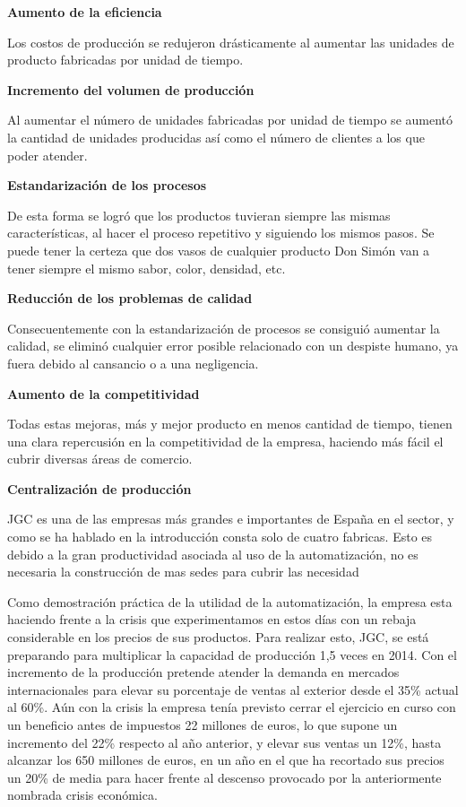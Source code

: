 \documentclass[11pt,a4paper,spanish,twoside]{report}
\begin{document}
\begin{description}
\item \textbf{Aumento de la eficiencia}

Los costos de producción se redujeron drásticamente al aumentar las
unidades de producto fabricadas por unidad de tiempo. 

\item \textbf{Incremento del volumen de producción}

Al aumentar el número de unidades fabricadas por unidad de tiempo se aumentó
la cantidad de unidades producidas así como el número de clientes a los que
poder atender.

\item \textbf{Estandarización de los procesos}

De esta forma se logró que los productos tuvieran siempre las mismas
características, al hacer el proceso repetitivo y siguiendo los mismos
pasos. Se puede tener la certeza que dos vasos de cualquier producto Don
Simón van a tener siempre el mismo sabor, color, densidad, etc.

\item \textbf{Reducción de los problemas de calidad}

Consecuentemente con la estandarización de procesos se consiguió aumentar la
calidad, se eliminó cualquier error posible relacionado con un despiste
humano, ya fuera debido al cansancio o a una negligencia. 

\item \textbf{Aumento de la competitividad}

Todas estas mejoras, más y mejor producto en menos cantidad de
tiempo, tienen una clara repercusión en la competitividad de la empresa,
haciendo más fácil el cubrir diversas áreas de comercio. 

\item \textbf{Centralización de producción}

JGC es una de las empresas más grandes e importantes de España en el sector,
y como se ha hablado en la introducción consta solo de cuatro fabricas. Esto
es debido a la gran productividad asociada al uso de la automatización, no es
necesaria la construcción de mas sedes para cubrir las necesidad

\end{description}

Como demostración práctica de la utilidad de la automatización, la empresa
esta haciendo frente a la crisis que experimentamos en estos días con un
rebaja considerable en los precios de sus productos. Para realizar esto, JGC,
se está preparando para multiplicar la capacidad de producción 1,5 veces en
2014. Con el incremento de la producción pretende atender la demanda en
mercados internacionales para elevar su porcentaje de ventas al exterior
desde el 35\% actual al 60\%. Aún con la crisis la empresa tenía previsto
cerrar el ejercicio en curso con un beneficio antes de impuestos 22 millones
de euros, lo que supone un incremento del 22\% respecto al año anterior, y
elevar sus ventas un 12\%, hasta alcanzar los 650 millones de euros, en un
año en el que ha recortado sus precios un 20\% de media para hacer frente al
descenso provocado por la anteriormente nombrada crisis económica.
\end{document}

